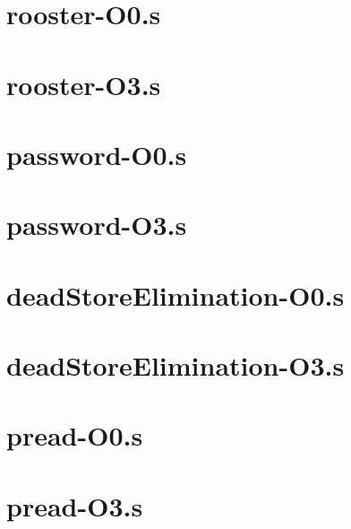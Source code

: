 \begin{appendices}
\section{rooster-O0.s}

\section{rooster-O3.s}


\section{password-O0.s}

\section{password-O3.s}


\section{deadStoreElimination-O0.s}

\section{deadStoreElimination-O3.s}


\section{pread-O0.s}

\section{pread-O3.s}


\end{appendices}